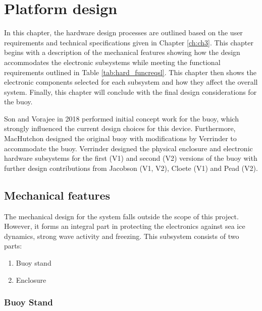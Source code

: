 
\chapter{Platform design}
\label{ch:ch4}

In this chapter, the hardware design processes are outlined based on the user requirements and technical specifications given in Chapter \ref{ch:ch3}. This chapter begins with a description of the mechanical features showing how the design accommodates the electronic subsystems while meeting the functional requirements outlined in Table \ref{tab:hard_funcreqsl}. This chapter then shows the electronic components selected for each subsystem and how they affect the overall system. Finally, this chapter will conclude with the final design considerations for the buoy. \par 

Son and Vorajee in 2018 performed initial concept work for the buoy, which strongly influenced the current design choices for this device. Furthermore, MacHutchon designed the original buoy with modifications by Verrinder to accommodate the buoy. Verrinder designed the physical enclosure and electronic hardware subsystems for the first (V1) and second (V2) versions of the buoy with further design contributions from Jacobson (V1, V2), Cloete (V1) and Pead (V2).
\section{Mechanical features}

The mechanical design for the system falls outside the scope of this project. However, it forms an integral part in protecting the electronics against sea ice dynamics, strong wave activity and freezing. This subsystem consists of two parts: 

\begin{enumerate}
	\item Buoy stand
	\item Enclosure
\end{enumerate}


\subsection{Buoy Stand}

